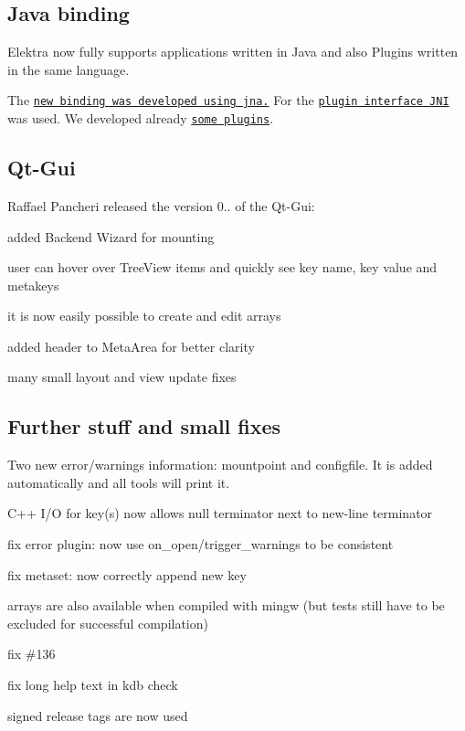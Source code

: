 \subsection*{Java binding}

Elektra now fully supports applications written in Java and also Plugins written in the same language.

The \href{https://github.com/ElektraInitiative/libelektra/tree/master/src/bindings/jna}{\tt new binding was developed using jna.} For the \href{https://github.com/ElektraInitiative/libelektra/tree/master/src/plugins/jni}{\tt plugin interface J\+NI} was used. We developed already \href{https://master.libelektra.org/src/bindings/jna/libelektra4j/src/main/java/org/libelektra/plugin}{\tt some plugins}.

\subsection*{Qt-\/\+Gui}

Raffael Pancheri released the version 0.. of the Qt-\/\+Gui\+:


\begin{DoxyItemize}
\item added Backend Wizard for mounting
\item user can hover over Tree\+View items and quickly see key name, key value and metakeys
\item it is now easily possible to create and edit arrays
\item added header to Meta\+Area for better clarity
\item many small layout and view update fixes
\end{DoxyItemize}

\subsection*{Further stuff and small fixes}


\begin{DoxyItemize}
\item Two new error/warnings information\+: mountpoint and configfile. It is added automatically and all tools will print it.
\item C++ I/O for key(s) now allows null terminator next to new-\/line terminator
\item fix error plugin\+: now use on\+\_\+open/trigger\+\_\+warnings to be consistent
\item fix metaset\+: now correctly append new key
\item arrays are also available when compiled with mingw (but tests still have to be excluded for successful compilation)
\item fix \#136
\item fix long help text in {\ttfamily kdb check}
\item signed release tags are now used
\end{DoxyItemize}

